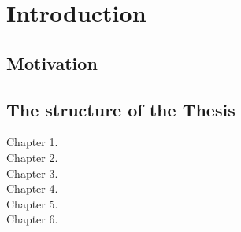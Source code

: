 \chapter{Introduction} %

\label{introduction} %

\singlespacing

\section{Motivation}

\section{The structure of the Thesis}

\begin{description}
  \item[Chapter 1.]
  \item[Chapter 2.]
  \item[Chapter 3.]
  \item[Chapter 4.]
  \item[Chapter 5.]
  \item[Chapter 6.]
\end{description}